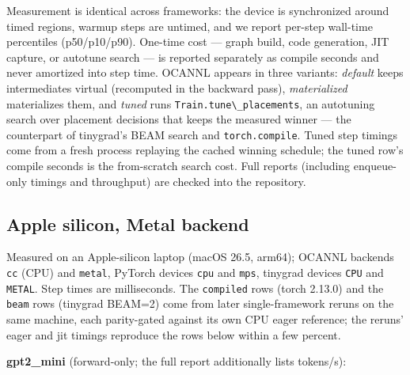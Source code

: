 \documentclass[
  10pt,
  letterpaper,
]{article}
\newcommand{\passthrough}[1]{#1}
\begin{document}
Measurement is identical across frameworks: the device is synchronized
around timed regions, warmup steps are untimed, and we report per-step
wall-time percentiles (p50/p10/p90). One-time cost --- graph build, code
generation, JIT capture, or autotune search --- is reported separately
as compile seconds and never amortized into step time. OCANNL appears in
three variants: \emph{default} keeps intermediates virtual (recomputed
in the backward pass), \emph{materialized} materializes them, and
\emph{tuned} runs \passthrough{\lstinline!Train.tune\_placements!}, an
autotuning search over placement decisions that keeps the measured
winner --- the counterpart of tinygrad's BEAM search and
\passthrough{\lstinline!torch.compile!}. Tuned step timings come from a
fresh process replaying the cached winning schedule; the tuned row's
compile seconds is the from-scratch search cost. Full reports (including
enqueue-only timings and throughput) are checked into the repository.

\subsection{Apple silicon, Metal
backend}\label{apple-silicon-metal-backend}

Measured on an Apple-silicon laptop (macOS 26.5, arm64); OCANNL backends
\passthrough{\lstinline!cc!} (CPU) and \passthrough{\lstinline!metal!},
PyTorch devices \passthrough{\lstinline!cpu!} and
\passthrough{\lstinline!mps!}, tinygrad devices
\passthrough{\lstinline!CPU!} and \passthrough{\lstinline!METAL!}. Step
times are milliseconds. The \passthrough{\lstinline!compiled!} rows
(torch 2.13.0) and the \passthrough{\lstinline!beam!} rows (tinygrad
BEAM=2) come from later single-framework reruns on the same machine,
each parity-gated against its own CPU eager reference; the reruns' eager
and jit timings reproduce the rows below within a few percent.

\textbf{gpt2\_mini} (forward-only; the full report additionally lists
tokens/s):
\end{document}
